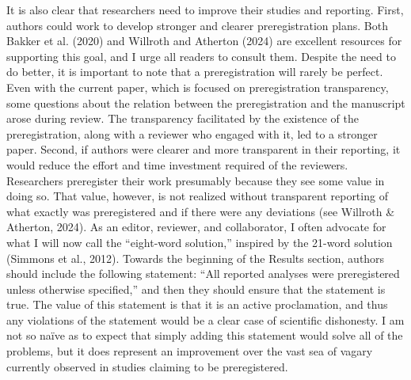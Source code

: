 \documentclass[authordate, meta, issue]{jote-new-article}
\begin{document}
	It is also clear that researchers need to improve their studies and reporting. First, authors could work to develop stronger and clearer preregistration plans. Both Bakker et al. (2020) and Willroth and Atherton (2024) are excellent resources for supporting this goal, and I urge all readers to consult them. Despite the need to do better, it is important to note that a preregistration will rarely be perfect. Even with the current paper, which is focused on preregistration transparency, some questions about the relation between the preregistration and the manuscript arose during review. The transparency facilitated by the existence of the preregistration, along with a reviewer who engaged with it, led to a stronger paper. Second, if authors were clearer and more transparent in their reporting, it would reduce the effort and time investment required of the reviewers. Researchers preregister their work presumably because they see some value in doing so. That value, however, is not realized without transparent reporting of what exactly was preregistered and if there were any deviations (see Willroth \& Atherton, 2024). As an editor, reviewer, and collaborator, I often advocate for what I will now call the “eight-word solution,” inspired by the 21-word solution (Simmons et al., 2012). Towards the beginning of the Results section, authors should include the following statement: “All reported analyses were preregistered unless otherwise specified,” and then they should ensure that the statement is true. The value of this statement is that it is an active proclamation, and thus any violations of the statement would be a clear case of scientific dishonesty. I am not so naïve as to expect that simply adding this statement would solve all of the problems, but it does represent an improvement over the vast sea of vagary currently observed in studies claiming to be preregistered.
\end{document}
